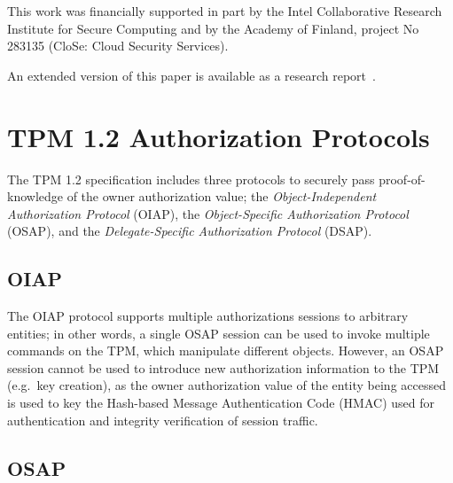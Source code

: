 \documentclass{sig-alternate-2013}
\def\istechreport{1}
\begin{document}
This work was financially supported in part by the Intel Collaborative Research
Institute for Secure Computing and by the Academy of Finland, project No 283135
(CloSe: Cloud Security Services).

\ifx\istechreport\undefined
An extended version of this paper is available as a research
report~\cite{Nyman14}.
\fi

 



\ifdefined\istechreport
\appendix

\section{TPM 1.2 Authorization Protocols}
\label{appendix:tpm-authprotocols}

The TPM 1.2 specification includes three protocols to securely pass
proof-of-knowledge of the owner authorization value; the
\emph{Object-Independent Authorization Protocol} (OIAP), the
\emph{Object-Specific Authorization Protocol} (OSAP), and the
\emph{Delegate-Specific Authorization Protocol} (DSAP). 

\subsection*{OIAP}

The OIAP protocol supports multiple authorizations sessions to arbitrary
entities; in other words, a single OSAP session can be used to invoke multiple
commands on the TPM, which manipulate different objects. However, an OSAP
session cannot be used to introduce new authorization information to the TPM
 (e.g.\ key creation), as the owner authorization value of the entity being
accessed is used to key the Hash-based Message Authentication Code (HMAC) used
for authentication and integrity verification of session traffic.

\subsection*{OSAP}
\end{document}
